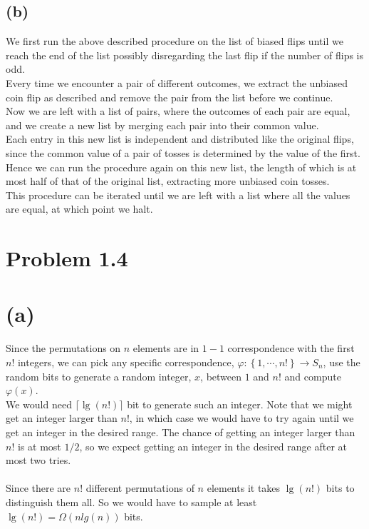 \documentclass[11pt]{article}
\begin{document}
\subsection*{(b)}
We first run the above described procedure on the list of biased flips until we reach the end of the list
possibly disregarding the last flip if the number of flips is odd. \\
Every time we encounter a pair of different outcomes, we extract the unbiased coin flip as described and remove the pair from the list
before we continue. \\
Now we are left with a list of pairs, where the outcomes of each pair are equal,
and we create a new list by merging each pair into their common value. \\
Each entry in this new list is independent and distributed like the original flips,
since the common value of a pair of tosses is determined by the value of the first. 
Hence we can run the procedure again on this new list, the length of which is at most half of that of the original list, 
extracting more unbiased coin tosses. \\
This procedure can be iterated until we are left with a list where all the values are equal,
at which point we halt.
\section*{Problem 1.4}
\section*{(a)}
Since the permutations on $n$ elements are in $1-1$ correspondence with the first $n!$ integers,
we can pick any specific correspondence, $\varphi:\left\{1,\cdots,n!\right\} \to S_n$, 
use the random bits to generate a random integer, $x$, between $1$ and $n!$
and compute $\varphi(x)$. \\
We would need $\lceil{\lg(n!)}\rceil$ bit to generate such an integer.
Note that we might get an integer larger than $n!$,
in which case we would have to try again until we get an integer in the desired range.
The chance of getting an integer larger than $n!$ is at most $1/2$, 
so we expect getting an integer in the desired range after at most two tries. \\ \\
Since there are $n!$ different permutations of $n$ elements it takes $\lg(n!)$ bits to distinguish them all.
So we would have to sample at least $\lg(n!)=\Omega(n lg(n))$ bits.
\end{document}
